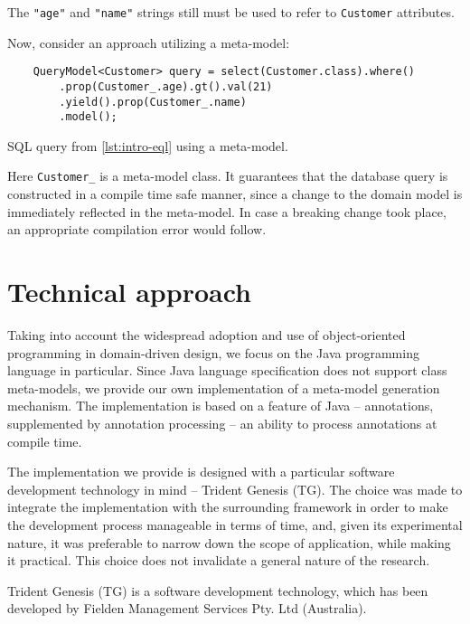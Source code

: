 The \texttt{"age"} and \texttt{"name"} strings still must be used to refer to \texttt{Customer} attributes.

\smallskip

Now, consider an approach utilizing a meta-model:

\begin{listing}[H]
    \begin{verbatim}
    QueryModel<Customer> query = select(Customer.class).where()
        .prop(Customer_.age).gt().val(21)
        .yield().prop(Customer_.name)
        .model();
    \end{verbatim}
    \caption{SQL query from \ref{lst:intro-eql} using a meta-model.}
    \label{lst:intro-sql-meta}
\end{listing}

Here \texttt{Customer\_} is a meta-model class. 
It guarantees that the database query is constructed in a compile time safe manner, since a change to the domain model is immediately reflected in the meta-model.
In case a breaking change took place, an appropriate compilation error would follow.

\section{Technical approach}
Taking into account the widespread adoption and use of object-oriented programming in domain-driven design, we focus on the Java programming language in particular.
Since Java language specification does not support class meta-models, we provide our own implementation of a meta-model generation mechanism. 
The implementation is based on a feature of Java -- annotations, supplemented by annotation processing -- an ability to process annotations at compile time.

\n

The implementation we provide is designed with a particular software development technology in mind – Trident Genesis (TG). The choice was made to integrate the implementation with the surrounding framework in order to make the development process manageable in terms of time, and, given its experimental nature, it was preferable to narrow down the scope of application, while making it practical. This choice does not invalidate a general nature of the research.

\n
Trident Genesis (TG) is a software development technology, which has been developed by Fielden Management Services Pty. Ltd (Australia).

\n

